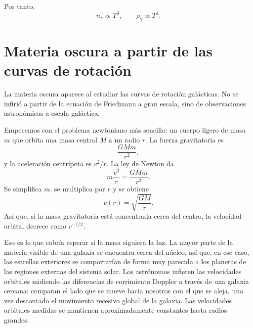 \begin{classroomqa}
\end{classroomqa}

Por tanto,
\begin{equation}
n_\gamma\propto T^3,
\qquad
\rho_\gamma\propto T^4.
\end{equation}

\section{Materia oscura a partir de las curvas de rotación}

La materia oscura aparece al estudiar las curvas de rotación galácticas. No se infirió a partir de la ecuación de Friedmann a gran escala, sino de observaciones astronómicas a escala galáctica.

Empecemos con el problema newtoniano más sencillo: un cuerpo ligero de masa \(m\) que orbita una masa central \(M\) a un radio \(r\). La fuerza gravitatoria es
\begin{equation}
\frac{GMm}{r^2},
\end{equation}
y la aceleración centrípeta es \(v^2/r\). La ley de Newton da
\begin{equation}
m\frac{v^2}{r}=\frac{GMm}{r^2}.
\end{equation}
Se simplifica \(m\), se multiplica por \(r\) y se obtiene
\begin{equation}
v(r)=\sqrt{\frac{GM}{r}}.
\end{equation}
Así que, si la masa gravitatoria está concentrada cerca del centro, la velocidad orbital decrece como \(r^{-1/2}\).

Eso es lo que cabría esperar si la masa siguiera la luz. La mayor parte de la materia visible de una galaxia se encuentra cerca del núcleo, así que, en ese caso, las estrellas exteriores se comportarían de forma muy parecida a los planetas de las regiones externas del sistema solar. Los astrónomos infieren las velocidades orbitales midiendo las diferencias de corrimiento Doppler a través de una galaxia cercana: comparan el lado que se mueve hacia nosotros con el que se aleja, una vez descontado el movimiento recesivo global de la galaxia. Las velocidades orbitales medidas se mantienen aproximadamente constantes hasta radios grandes.

